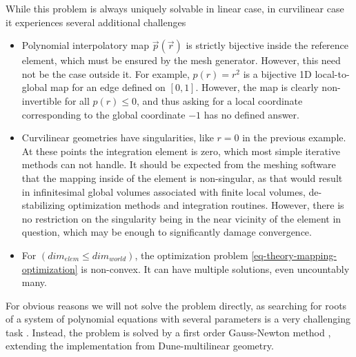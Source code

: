 \noindent
While this problem is always uniquely solvable in linear case, in curvilinear case it experiences several additional challenges
\begin{itemize}
	\item Polynomial interpolatory map $\vec{p}(\vec{r})$ is strictly bijective inside the reference element, which must be ensured by the mesh generator. However, this need not be the case outside it. For example, $p(r) = r^2$ is a bijective 1D local-to-global map for an edge defined on $[0,1]$. However, the map is clearly non-invertible for all $p(r) \leq 0$, and thus asking for a local coordinate corresponding to the global coordinate $-1$ has no defined answer.
	\item Curvilinear geometries have singularities, like $r = 0$ in the previous example. At these points the integration element is zero, which most simple iterative methods can not handle. It should be expected from the meshing software that the mapping inside of the element is non-singular, as that would result in infinitesimal global volumes associated with finite local volumes, de-stabilizing optimization methods and integration routines. However, there is no restriction on the singularity being in the near vicinity of the element in question, which may be enough to significantly damage convergence.
	\item For $(dim_{elem} \leq dim_{world})$, the optimization problem \ref{eq-theory-mapping-optimization} is non-convex. It can have multiple solutions, even uncountably many.
\end{itemize}

\noindent
For obvious reasons we will not solve the problem directly, as searching for roots of a system of polynomial equations with several parameters is a very challenging task \cite{canny+1989}. Instead, the problem is solved by a first order Gauss-Newton method \cite{bjoerck+1996}, extending the implementation from Dune-multilinear geometry.

